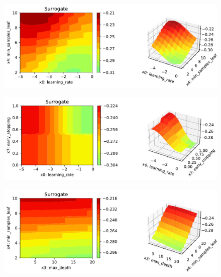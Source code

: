 \documentclass[
  letterpaper,
  DIV=11,
  numbers=noendperiod]{scrreprt}
\begin{document}
\begin{figure}[H]

{\centering \includegraphics{17_spot_hpt_sklearn_multiclass_classification_xgb_files/figure-pdf/cell-47-output-3.pdf}

}

\end{figure}

\begin{figure}[H]

{\centering \includegraphics{17_spot_hpt_sklearn_multiclass_classification_xgb_files/figure-pdf/cell-47-output-4.pdf}

}

\end{figure}

\begin{figure}[H]

{\centering \includegraphics{17_spot_hpt_sklearn_multiclass_classification_xgb_files/figure-pdf/cell-47-output-5.pdf}

}

\end{figure}
\end{document}
